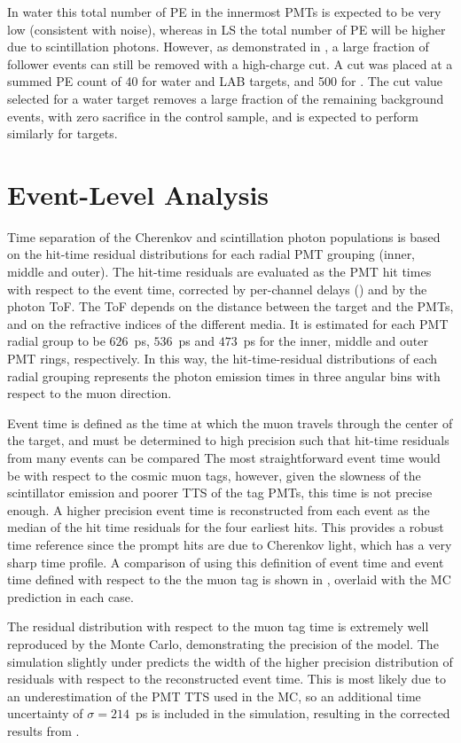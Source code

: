 In water this total number of PE in the innermost PMTs is expected to be very low (consistent with noise), whereas in LS the total number of PE will be higher due to scintillation photons.  
However, as demonstrated in , a large fraction of follower events can still be removed with a high-charge cut.   
A cut was placed at a summed PE count of 40 for water and LAB targets, and 500 for {\labppo}.  
The cut value selected for a water target removes a large fraction of the remaining background events, with zero sacrifice in the control sample, and is expected to perform similarly for {\labppo} targets.

\section{Event-Level Analysis}\label{s:recon}

Time separation of the Cherenkov and scintillation photon populations is based on the hit-time residual distributions for each radial PMT grouping (inner, middle and outer).  
The hit-time residuals are evaluated as the PMT hit times with respect to the event time, corrected by per-channel delays () and by the photon ToF.  
The ToF depends on the distance between the target and the PMTs, and on the refractive indices of the different media. 
It is estimated for each PMT radial group to be $626$~ps, $536$~ps and $473$~ps for the inner, middle and outer PMT rings, respectively.
In this way, the hit-time-residual distributions of each radial grouping represents the photon emission times in three angular bins with respect to the muon direction.

Event time is defined as the time at which the muon travels through the center of the target, and must be determined to high precision such that hit-time residuals from many events can be compared
The most straightforward event time would be with respect to the cosmic muon tags, however, given the slowness of the scintillator emission and poorer TTS of the tag PMTs, this time is not precise enough.
A higher precision event time is reconstructed from each event as the median of the hit time residuals for the four earliest hits.
This provides a robust time reference since the prompt hits are due to Cherenkov light, which has a very sharp time profile.
A comparison of using this definition of event time and event time defined with respect to the the muon tag is shown in , overlaid with the MC prediction in each case.  

The residual distribution with respect to the muon tag time is extremely well reproduced by the Monte Carlo, demonstrating the precision of the model.
The simulation slightly under predicts the width of the higher precision distribution of residuals with respect to the reconstructed event time.  
This is most likely due to an underestimation of the PMT TTS used in the MC, so an additional time uncertainty of $\sigma=214$~ps is included in the simulation, resulting in the corrected results from .


